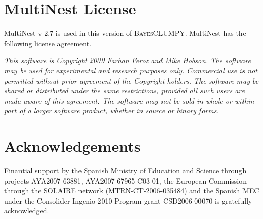 \documentclass[12pt]{article}
\def\B{\textsc{BayesCLUMPY}}
\begin{document}
\section{MultiNest License}

MultiNest v 2.7 is used in this version of \B. MultiNest has the following license agreement.

\emph{This software is Copyright 2009 Farhan Feroz and Mike Hobson. The software
may be used for experimental and research purposes only. Commercial use is
not permitted without prior agreement of the Copyright holders. The
software may be shared or distributed under the same restrictions, provided
all such users are made aware of this agreement. The software may not be
sold in whole or within part of a larger software product, whether in
source or binary forms.}


\section*{Acknowledgements}
Finantial support by
the Spanish Ministry of Education and Science through projects AYA2007-63881, AYA2007-67965-C03-01,
the European Commission through the SOLAIRE network (MTRN-CT-2006-035484) and the
Spanish MEC under the Consolider-Ingenio 2010 Program grant CSD2006-00070 is gratefully acknowledged. 

% 
% 
\end{document}
